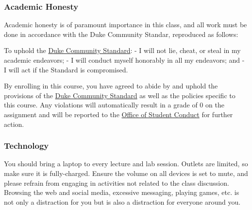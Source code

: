 \documentclass[
]{article}
\begin{document}
\hypertarget{academic-honesty}{%
\subsubsection{Academic Honesty}\label{academic-honesty}}

Academic honesty is of paramount importance in this class, and all work
must be done in accordance with the Duke Community Standar, reproduced
as follows:

To uphold the
\href{https://studentaffairs.duke.edu/conduct/about-us/duke-community-standard}{Duke
Community Standard}: - I will not lie, cheat, or steal in my academic
endeavors; - I will conduct myself honorably in all my endeavors; and -
I will act if the Standard is compromised.

By enrolling in this course, you have agreed to abide by and uphold the
provisions of the
\href{https://studentaffairs.duke.edu/conduct/about-us/duke-community-standard}{Duke
Community Standard} as well as the policies specific to this course. Any
violations will automatically result in a grade of 0 on the assignment
and will be reported to the
\href{https://studentaffairs.duke.edu/conduct}{Office of Student
Conduct} for further action.

\hypertarget{technology}{%
\subsubsection{Technology}\label{technology}}

You should bring a laptop to every lecture and lab session. Outlets are
limited, so make sure it is fully-charged. Ensure the volume on all
devices is set to mute, and please refrain from engaging in activities
not related to the class discussion. Browsing the web and social media,
excessive messaging, playing games, etc. is not only a distraction for
you but is also a distraction for everyone around you.
\end{document}
